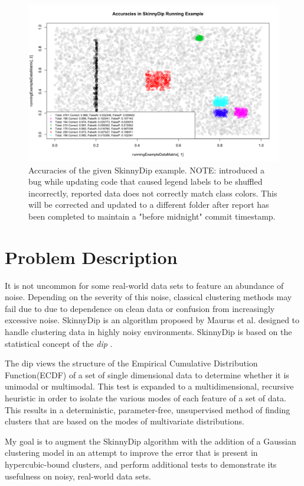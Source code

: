 \documentclass{sig-alternate-05-2015}
\begin{document}
\begin{figure}[t]
\centering
\includegraphics[width=\textwidth]{images/SkinnyDipAccuracy}
\caption{Accuracies of the given SkinnyDip example. NOTE: introduced a bug while updating code that caused legend labels to be shuffled incorrectly, reported data does not correctly match class colors. This will be corrected and updated to a different folder after report has been completed to maintain a "before midnight" commit timestamp.}
\label{fig:sdaccuracy}
\end{figure}

\section{Problem Description}
It is not uncommon for some real-world data sets to feature an abundance of noise. Depending on the severity of this noise, classical clustering methods may fail due to due to dependence on clean data or confusion from increasingly excessive noise. SkinnyDip is an algorithm proposed by Maurus et al.\cite{skinnydip} designed to handle clustering data in highly noisy environments. SkinnyDip is based on the statistical concept of the \textit{dip} \cite{dip}. 

The dip views the structure of the Empirical Cumulative Distribution Function(ECDF) of a set of single dimensional data to determine whether it is unimodal or multimodal. This test is expanded to a multidimensional, recursive heuristic in order to isolate the various modes of each feature of a set of data. This results in a deterministic, parameter-free, unsupervised method of finding clusters that are based on the modes of multivariate distributions. 

My goal is to augment the SkinnyDip algorithm with the addition of a Gaussian clustering model in an attempt to improve the error that is present in hypercubic-bound clusters, and perform additional tests to demonstrate its usefulness on noisy, real-world data sets.
\end{document}
